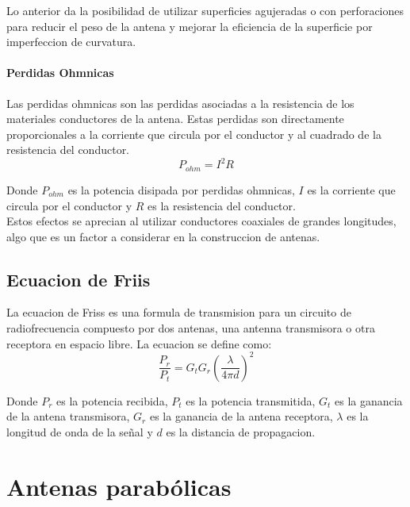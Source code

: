 Lo anterior da la posibilidad de utilizar superficies agujeradas o con perforaciones para reducir el peso de la antena y mejorar la eficiencia de la superficie por imperfeccion de curvatura.\\

\paragraph{Perdidas Ohmnicas}

Las perdidas ohmnicas son las perdidas asociadas a la resistencia de los materiales conductores de la antena. Estas perdidas son directamente proporcionales a la corriente que circula por el conductor y al cuadrado de la resistencia del conductor.\\

\begin{equation}
    P_{ohm} = I^{2}R
\end{equation}

Donde $P_{ohm}$ es la potencia disipada por perdidas ohmnicas, $I$ es la corriente que circula por el conductor y $R$ es la resistencia del conductor.\\

Estos efectos se aprecian al utilizar conductores coaxiales de grandes longitudes, algo que es un factor a considerar en la construccion de antenas.\\

\subsection{Ecuacion de Friis}

La ecuacion de Friss es una formula de transmision para un circuito de radiofrecuencia compuesto por dos antenas, una antenna transmisora o otra receptora en espacio libre\cite{Friis1946}. La ecuacion se define como:\\

\begin{equation}
    \frac{P_{r}}{P_{t}} = G_{t}G_{r}\left(\frac{\lambda}{4\pi d}\right)^{2}
\end{equation}

Donde $P_{r}$ es la potencia recibida, $P_{t}$ es la potencia transmitida, $G_{t}$ es la ganancia de la antena transmisora, $G_{r}$ es la ganancia de la antena receptora, $\lambda$ es la longitud de onda de la señal y $d$ es la distancia de propagacion.\\

\section{Antenas parabólicas}

